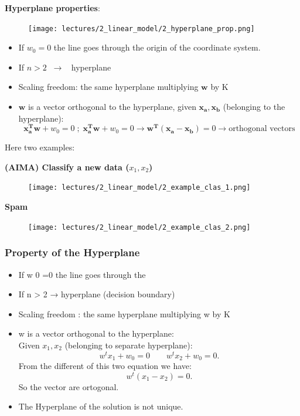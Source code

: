 \documentclass[../main.tex]{subfiles}
\begin{document}
\textbf{Hyperplane properties}:
\begin{figure}[H]
    \centering
    \texttt{[image: lectures/2\_linear\_model/2\_hyperplane\_prop.png]}
\end{figure}
\begin{itemize}
    \item If $w_0=0$ the line goes through the origin of the coordinate system.
    \item If $n > 2 \;\; \rightarrow \;\;$ hyperplane 
    \item Scaling freedom: the same hyperplane multiplying $\mathbf{w}$ by K
    \item $\mathbf{w}$ is a vector orthogonal to the hyperplane, given $\mathbf{x_a}, \mathbf{x_b}$ (belonging to the hyperplane): $$\mathbf{x_a^Tw}+w_0=0 \;;\; \mathbf{x_a^Tw}+w_0=0 \rightarrow \mathbf{w^T}(\mathbf{x_a- x_b})=0 \rightarrow \text{orthogonal vectors}$$
\end{itemize}
Here two examples:

\textbf{(AIMA) Classify a new data ($x_1,x_2$)}
\begin{figure}[H]
    \centering
    \texttt{[image: lectures/2\_linear\_model/2\_example\_clas\_1.png]}
\end{figure}

\textbf{Spam}
\begin{figure}[H]
    \centering
    \texttt{[image: lectures/2\_linear\_model/2\_example\_clas\_2.png]}
\end{figure}

\subsubsection{Property of the Hyperplane}%
\begin{itemize}
    \item If w 0 =0 the line goes through the
    \item If n > 2 → hyperplane (decision boundary)
    \item Scaling freedom : the same hyperplane multiplying w by K
    \item w is a vector orthogonal to the hyperplane:\\
	Given $x_1, x_2$ (belonging to separate hyperplane):
	\[
	    w^tx_1 + w_0 = 0 \qquad w^tx_2 + w_0 = 0
	.\] 
	From the different of this two equation we have:
	\[
	    w^t (x_1-x_2) = 0
	.\] 
	So the vector are ortogonal.
    \item The Hyperplane of the solution is not unique.
\end{itemize}
\end{document}
